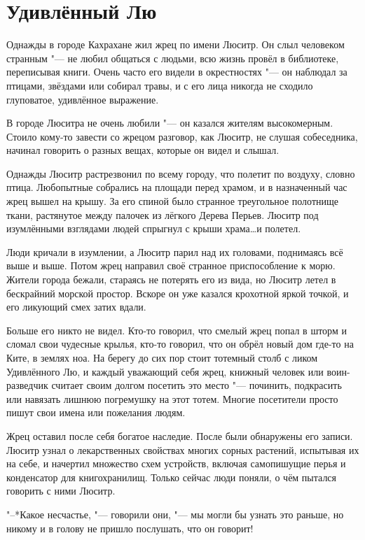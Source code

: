 \documentclass[a4paper,10pt]{book}
\begin{document}
\section{Удивлённый Лю}

Однажды в городе Кахрахане жил жрец по имени Люситр. Он слыл человеком странным 
"--- не любил общаться с людьми, всю жизнь провёл в библиотеке, переписывая 
книги. Очень часто его видели в окрестностях "--- он наблюдал за птицами, 
звёздами или собирал травы, и с его лица никогда не сходило глуповатое, 
удивлённое выражение.

В городе Люситра не очень любили "--- он казался жителям высокомерным. Стоило 
кому-то завести со жрецом разговор, как Люситр, не слушая собеседника, начинал 
говорить о разных вещах, которые он видел и слышал.

Однажды Люситр растрезвонил по всему городу, что полетит по воздуху, словно 
птица. Любопытные собрались на площади перед храмом, и в назначенный час жрец 
вышел на крышу. За его спиной было странное треугольное полотнище ткани, 
растянутое между палочек из лёгкого Дерева Перьев. Люситр под изумлёнными 
взглядами людей спрыгнул с крыши храма\dots и полетел.

Люди кричали в изумлении, а Люситр парил над их головами, поднимаясь всё выше и 
выше. Потом жрец направил своё странное приспособление к морю. Жители города 
бежали, стараясь не потерять его из вида, но Люситр летел в бескрайний морской 
простор. Вскоре он уже казался крохотной яркой точкой, и его ликующий смех 
затих вдали.

Больше его никто не видел. Кто-то говорил, что смелый жрец попал в шторм и 
сломал свои чудесные крылья, кто-то говорил, что он обрёл новый дом где-то на 
Ките, в землях ноа. На берегу до сих пор стоит тотемный столб с ликом 
Удивлённого Лю, и каждый уважающий себя жрец, книжный человек или 
воин-разведчик считает своим долгом посетить это место "--- починить, 
подкрасить 
или навязать лишнюю погремушку на этот тотем. Многие посетители просто пишут 
свои имена или пожелания людям.

Жрец оставил после себя богатое наследие. После были обнаружены его записи.
Люситр узнал о лекарственных свойствах многих сорных растений, испытывая их на 
себе, 
и начертил множество схем устройств, включая самопишущие перья и конденсатор 
для книгохранилищ. Только сейчас люди поняли, о чём пытался говорить с ними 
Люситр.

"--*Какое несчастье, "--- говорили они, "--- мы могли бы узнать это раньше,
но никому и в голову не пришло послушать, что он говорит!
\end{document}
